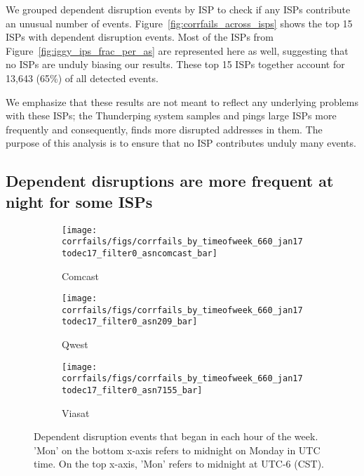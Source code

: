 We grouped dependent disruption events by ISP to check if any ISPs contribute an
unusual number of events. Figure~\ref{fig:corrfails_across_isps} shows the top 15
ISPs with dependent disruption events. Most of the ISPs from
Figure~\ref{fig:iggy_ips_frac_per_as} are represented here as well, suggesting
that no ISPs are unduly biasing our results. These top 15 ISPs together account
for 13,643 (65\%) of all detected events.

We emphasize that these results are not meant to reflect any
underlying problems with these ISPs; the Thunderping system samples
and pings large ISPs more frequently and consequently, finds more
disrupted addresses in them. The purpose of this analysis is to ensure
that no ISP contributes unduly many events.

\subsection{Dependent disruptions are more frequent at night for some
ISPs}

\begin{figure*}[t]
\begin{subfigure}[t]{0.32\linewidth}
\centering
\texttt{[image: corrfails/figs/corrfails\_by\_timeofweek\_660\_jan17todec17\_filter0\_asncomcast\_bar]}
\caption{
Comcast
\label{fig:corrfails_timeofweek_comcast}
}
\end{subfigure}
%
\hfill
%
\begin{subfigure}[t]{0.32\linewidth}
\centering
\texttt{[image: corrfails/figs/corrfails\_by\_timeofweek\_660\_jan17todec17\_filter0\_asn209\_bar]}
\caption{
Qwest
\label{fig:corrfails_timeofweek_qwest}
}
\end{subfigure}
%
\hfill
%
\begin{subfigure}[t]{0.32\linewidth}
\centering
\texttt{[image: corrfails/figs/corrfails\_by\_timeofweek\_660\_jan17todec17\_filter0\_asn7155\_bar]}
\caption{
Viasat
\label{fig:corrfails_timeofweek_viasat}
}
\end{subfigure}
\caption[Dependent disruption events that began in each hour of the week]{
\label{fig:corrfails_tow_asn}
Dependent disruption events that began in each hour of the week. 'Mon' on the
bottom x-axis refers to midnight on Monday in UTC time. On the top x-axis, 'Mon' refers to midnight at UTC-6 (CST). 
}
\end{figure*}

 
